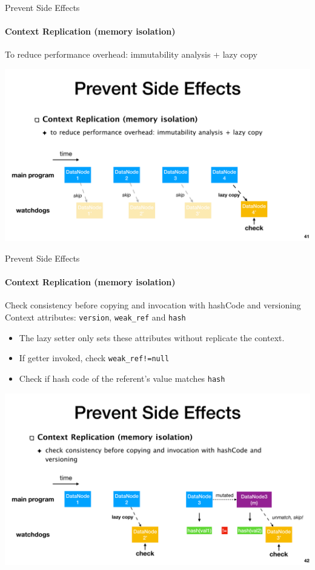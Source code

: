 \documentclass[aspectratio=169]{beamer}
\begin{document}
\begin{frame}{Prevent Side Effects}
    \framesubtitle{Context Replication (memory isolation)}
    To reduce performance overhead: immutability analysis + lazy copy
    \begin{center}
        \includegraphics[width=.9\textwidth]{fig/lazy-copy}
    \end{center}
\end{frame}

\begin{frame}{Prevent Side Effects}
    \framesubtitle{Context Replication (memory isolation)}
    \begin{block}{Check consistency before copying and invocation with hashCode and versioning}
        Context attributes: \texttt{version}, \texttt{weak\_ref} and \texttt{hash}
        \begin{itemize}
            \item The lazy setter only sets these attributes without replicate the context.
            \item If getter invoked, check \texttt{weak\_ref!=null}
            \item Check if hash code of the referent’s value matches \texttt{hash}
        \end{itemize}
    \end{block}
    \begin{center}
        \includegraphics[width=.8\textwidth]{fig/hash}
    \end{center}
\end{frame}
\end{document}
